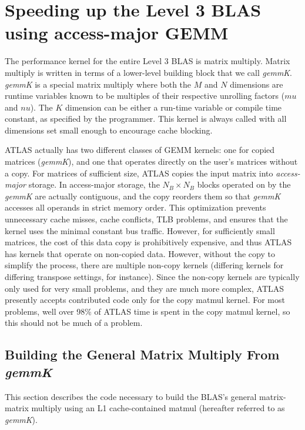 \documentclass[11pt]{article}
\begin{document}
\section{Speeding up the Level 3 BLAS using access-major GEMM}

The performance kernel for the entire Level 3 BLAS is matrix multiply.
Matrix multiply is written in terms of a lower-level building block that
we call {\it gemmK}.  {\it gemmK} is a special matrix multiply where
both the $M$ and $N$ dimensions are runtime variables known to be multiples
of their respective unrolling factors ($mu$ and $nu$).  The $K$ dimension
can be either a run-time variable or compile time constant, as specified
by the programmer.  This kernel is always called with all dimensions set
small enough to encourage cache blocking.

ATLAS actually has two different classes of GEMM kernels: one for copied
matrices ({\it gemmK}), and one that operates directly on the user's matrices
without a copy.  For matrices of
sufficient size, ATLAS copies the input matrix into {\em access-major} storage.
In access-major storage, the $N_B \times N_B$ blocks operated on by the
{\it gemmK} are actually contiguous, and the copy reorders them so that
{\it gemmK} accesses all operands in strict memory order.  This optimization
prevents unnecessary cache misses, cache conflicts, TLB problems, and ensures
that the kernel uses the minimal constant bus traffic.  However, for
sufficiently
small matrices, the cost of this data copy is prohibitively expensive,
and thus ATLAS has kernels that operate on non-copied data.  However,
without the copy to simplify the process, there are multiple non-copy
kernels (differing kernels for differing transpose settings, for instance).
Since the non-copy kernels are typically only used for very small problems,
and they are much more complex, ATLAS presently accepts contributed code
only for the copy matmul kernel.  For most problems, well over 98\% of ATLAS
time is spent in the copy matmul kernel, so this should not be much of 
a problem.

\subsection{Building the General Matrix Multiply From {\it gemmK}}
\label{sec-buildAMM}

This section describes the code necessary to build the BLAS's general
matrix-matrix multiply using an L1 cache-contained
matmul (hereafter referred to as {\it gemmK}).
\end{document}
